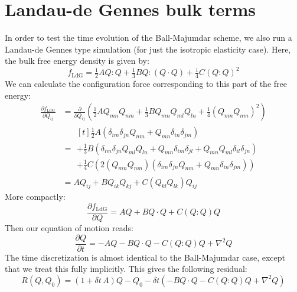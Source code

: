 \documentclass[reqno]{article}
\begin{document}
\section{Landau-de Gennes bulk terms}
In order to test the time evolution of the Ball-Majumdar scheme, we also run a Landau-de Gennes type simulation (for just the isotropic elasticity case).
Here, the bulk free energy density is given by:
\begin{equation}
    f_\text{LdG} = \tfrac12 A Q:Q + \tfrac13 B Q: (Q\cdot Q) + \tfrac14 C \left(Q:Q\right)^2
\end{equation}
We can calculate the configuration force corresponding to this part of the free energy:
\begin{equation}
    \begin{split}
    \frac{\partial f_\text{LdG}}{\partial Q_{ij}}
    &=
    \frac{\partial}{\partial Q_{ij}}
    \left(
        \tfrac12 A Q_{mn} Q_{nm}
        + \tfrac13 B Q_{mn} Q_{ml} Q_{ln}
        + \tfrac14 \left( Q_{mn} Q_{nm} \right)^2
    \right) \\
    &=
    \begin{multlined}[t]
    \tfrac12 A \left( \delta_{im} \delta_{jn} Q_{nm} 
        + Q_{mn} \delta_{in} \delta_{jm} \right) \\
    + \tfrac13 B \left( \delta_{im} \delta_{jn} Q_{ml} Q_{ln} 
        + Q_{mn} \delta_{im} \delta_{jl}
        + Q_{mn} Q_{ml} \delta_{il} \delta_{jn} \right) \\
    + \tfrac14 C \left( 2 (Q_{mn} Q_{nm}) \left( \delta_{im} \delta_{jn} Q_{nm}
        + Q_{mn} \delta_{in} \delta_{jm} \right) \right)
    \end{multlined} \\
    &=
    A Q_{ij}
    + B Q_{ik} Q_{kj}
    + C (Q_{kl} Q_{lk}) Q_{ij}
    \end{split}
\end{equation}
More compactly:
\begin{equation}
    \frac{\partial f_\text{LdG}}{\partial Q}
    =
    A Q + B Q \cdot Q + C (Q : Q)Q
\end{equation}
Then our equation of motion reads:
\begin{equation}
    \frac{\partial Q}{\partial t}
    =
    - AQ - B Q \cdot Q - C (Q : Q) Q
    + \nabla^2 Q
\end{equation}
The time discretization is almost identical to the Ball-Majumdar case, except that we treat this fully implicitly.
This gives the following residual:
\begin{equation}
    R(Q, Q_0)
    =
    (1 + \delta t \, A) Q 
    - Q_0
    - \delta t 
    \left(
        - B Q \cdot Q
        - C (Q : Q) Q
        + \nabla^2 Q
    \right)
\end{equation}
\end{document}
